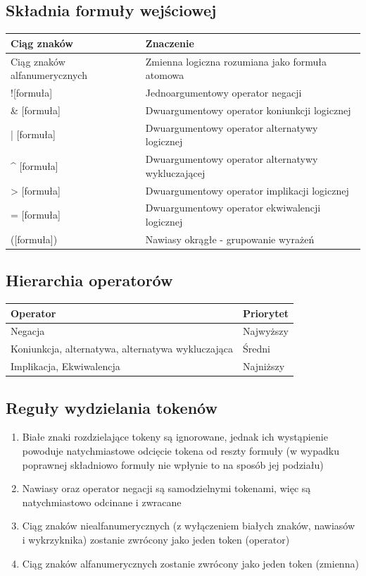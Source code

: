 \documentclass[12pt,a4paper,titlepage]{article}
\begin{document}
\subsection{Składnia formuły wejściowej}
\label{skladnia}
\begin{tabular}{|C{5cm}|C{5cm}|}
  \hline
  \textbf{Ciąg znaków} & \textbf{Znaczenie}\\ 
  \hline 
  Ciąg znaków alfanumerycznych & Zmienna logiczna rozumiana jako formuła atomowa\\
  \hline
  ![formuła] & Jednoargumentowy operator negacji\\
  \hline
  [formuła] \& [formuła] & Dwuargumentowy operator koniunkcji logicznej\\
  \hline
  [formuła] | [formuła] & Dwuargumentowy operator alternatywy logicznej\\
  \hline
  [formuła] \^{} [formuła] & Dwuargumentowy operator alternatywy wykluczającej\\
  \hline
  [formuła] > [formuła] & Dwuargumentowy operator implikacji logicznej\\
  \hline
  [formuła] = [formuła] & Dwuargumentowy operator ekwiwalencji logicznej\\
  \hline
  ([formuła]) & Nawiasy okrągłe - grupowanie wyrażeń\\
  \hline
\end{tabular}

\subsection{Hierarchia operatorów}
\begin{tabular}{|C{5cm}|C{5cm}|}
  \hline
  \textbf{Operator} & \textbf{Priorytet}\\
  \hline
  Negacja & Najwyższy\\
  \hline
  Koniunkcja, alternatywa, alternatywa wykluczająca & Średni\\
  \hline
  Implikacja, Ekwiwalencja & Najniższy\\
  \hline
\end{tabular}

\subsection{Reguły wydzielania tokenów}
\begin{enumerate}
	\item Białe znaki rozdzielające tokeny są ignorowane, jednak ich wystąpienie powoduje natychmiastowe odcięcie tokena od reszty formuły (w wypadku poprawnej składniowo formuły nie wpłynie to na sposób jej podziału)
	\item Nawiasy oraz operator negacji są samodzielnymi tokenami, więc są natychmiastowo odcinane i zwracane
	\item Ciąg znaków niealfanumerycznych (z wyłączeniem białych znaków, nawiasów i wykrzyknika) zostanie zwrócony jako jeden token (operator)
	\item Ciąg znaków alfanumerycznych zostanie zwrócony jako jeden token (zmienna)
\end{enumerate}
\end{document}
